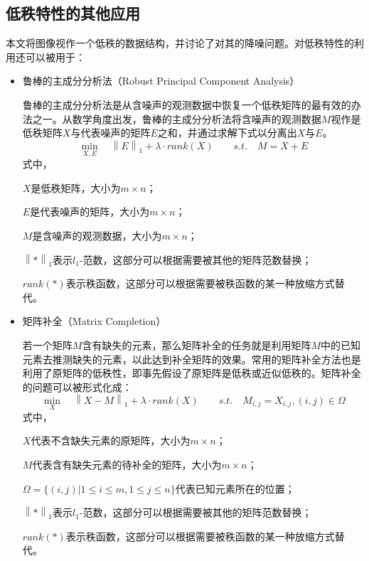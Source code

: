 \documentclass[12pt, a4paper]{article}
\begin{document}
\subsection{低秩特性的其他应用}
\par 本文将图像视作一个低秩的数据结构，并讨论了对其的降噪问题。对低秩特性的利用还可以被用于\cite{Review}：
\begin{itemize}
\item 鲁棒的主成分分析法（Robust Principal Component Analysis）
\par 鲁棒的主成分分析法是从含噪声的观测数据中恢复一个低秩矩阵的最有效的办法之一。从数学角度出发，鲁棒的主成分分析法将含噪声的观测数据$M$视作是低秩矩阵$X$与代表噪声的矩阵$E$之和，并通过求解下式以分离出$X$与$E$。
\begin{displaymath}
\min\limits_{X,E}\quad \left\|E\right\|_1 + \lambda \cdot rank(X) \qquad s.t.\quad M=X+E
\end{displaymath}
式中，
\par$X$是低秩矩阵，大小为$m \times n$；
\par$E$是代表噪声的矩阵，大小为$m \times n$；
\par$M$是含噪声的观测数据，大小为$m \times n$；
\par$\left\|*\right\|_1$表示$l_1$-范数，这部分可以根据需要被其他的矩阵范数替换；
\par$rank(*)$表示秩函数，这部分可以根据需要被秩函数的某一种放缩方式替代。
\item 矩阵补全（Matrix Completion）
\par 若一个矩阵$M$含有缺失的元素，那么矩阵补全的任务就是利用矩阵$M$中的已知元素去推测缺失的元素，以此达到补全矩阵的效果。常用的矩阵补全方法也是利用了原矩阵的低秩性，即事先假设了原矩阵是低秩或近似低秩的。矩阵补全的问题可以被形式化成：
\begin{displaymath}
\min\limits_{X}\quad \left\|X-M\right\|_1 + \lambda \cdot rank(X) \qquad s.t.\quad M_{i,j}=X_{i,j}, (i,j)\in\Omega
\end{displaymath}
式中，
\par$X$代表不含缺失元素的原矩阵，大小为$m \times n$；
\par$M$代表含有缺失元素的待补全的矩阵，大小为$m \times n$；
\par$\Omega=\{(i,j)|1\leq i \leq m, 1\leq j \leq n\}$代表已知元素所在的位置；
\par$\left\|*\right\|_1$表示$l_1$-范数，这部分可以根据需要被其他的矩阵范数替换；
\par$rank(*)$表示秩函数，这部分可以根据需要被秩函数的某一种放缩方式替代。
		

\end{itemize}
\end{document}
